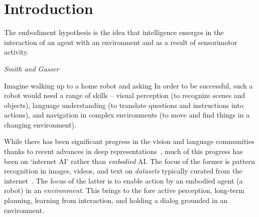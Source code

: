 \section{Introduction}

\epigraph{The embodiment hypothesis is the idea that intelligence emerges in the interaction of an agent with
an environment
and as a result of sensorimotor activity.}
{\textit{Smith and Gasser~\cite{smith_al05}}}

Imagine walking up to a home robot and asking  In order to be successful, such a robot would need a range of skills -- visual perception (to recognize scenes and objects), language understanding (to translate questions and instructions into actions), and navigation in complex environments (to move and find things in a changing environment). 

While there has been significant progress in the vision and language communities thanks to recent advances in deep representations~\cite{he_cvpr16, devlin_arxiv18}, much of this progress has been on `internet AI' rather than \emph{embodied} AI. The focus of the former is pattern recognition in images, videos, and text on \emph{datasets} typically curated from the internet~\cite{Deng09imagenet, mscoco, antol_iccv15}. The focus of the latter is to enable action by an embodied agent (\eg a robot) in an \emph{environment}. This brings to the fore active perception, long-term planning, learning from interaction, and holding a dialog grounded in an environment.

